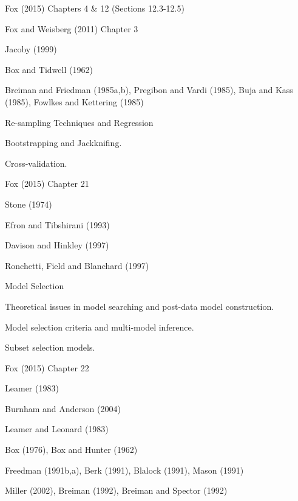 \documentclass[letterpaper]{article}
\renewenvironment{itemize}{
  \begin{list}{}{
    \setlength{\leftmargin}{1.5em}
  }
}{
  \end{list}
}
\begin{document}
\begin{enumerate}
			\begin{itemize}
				\item[$\star$] Fox (2015) Chapters 4 \& 12 (Sections 12.3-12.5) 
				\item[$\star$] Fox and Weisberg (2011) Chapter 3
				\item[$\star$] Jacoby (1999)
				\item[-] Box and Tidwell (1962)
				\item[-] Breiman and Friedman (1985a,b), Pregibon and Vardi (1985), Buja and Kass (1985), Fowlkes and Kettering (1985)
			\end{itemize}


	\item Re-sampling Techniques and Regression

			\begin{itemize}
				\item[$\square$] Bootstrapping and Jackknifing.
				\item[$\square$] Cross-validation.
			\end{itemize}


			\begin{itemize}
				\item[$\star$] Fox (2015) Chapter 21
				\item[-] Stone (1974)
				\item[-] Efron and Tibshirani (1993)
				\item[-] Davison and Hinkley (1997)
				\item[-] Ronchetti, Field and Blanchard (1997)
			\end{itemize}


	\item Model Selection


			\begin{itemize}
				\item[$\square$] Theoretical issues in model searching and post-data model construction.
				\item[$\square$] Model selection criteria and multi-model inference.
				\item[$\square$] Subset selection models.
			\end{itemize}


			\begin{itemize}
				\item[$\star$] Fox (2015) Chapter 22
				\item[$\star$] Leamer (1983)
				\item[$\star$] Burnham and Anderson (2004)
				\item[$\star$] Leamer and Leonard (1983)
				\item[$\star$] Box (1976), Box and Hunter (1962)
				\item[-] Freedman (1991b,a), Berk (1991), Blalock (1991), Mason (1991) 
				\item[-] Miller (2002), Breiman (1992), Breiman and Spector (1992)
			\end{itemize}



\end{enumerate}
\end{document}
